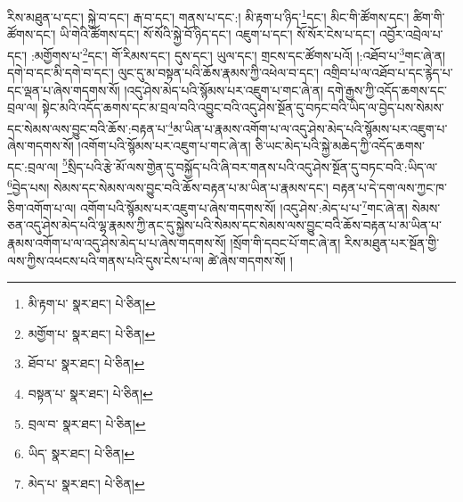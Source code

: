 རིས་མཐུན་པ་དང་། སྐྱེ་བ་དང་། རྒ་བ་དང་། གནས་པ་དང་:། མི་རྟག་པ་ཉིད་\footnote{མི་རྟག་པ་  སྣར་ཐང་།  པེ་ཅིན། }དང་། མིང་གི་ཚོགས་དང་། ཚིག་གི་ཚོགས་དང་། ཡི་གེའི་ཚོགས་དང་། སོ་སོའི་སྐྱེ་བོ་ཉིད་དང་། འཇུག་པ་དང་། སོ་སོར་ངེས་པ་དང་། འབྱོར་འབྲེལ་པ་དང་། :མགྱོགས་པ་\footnote{མགྱོག་པ་  སྣར་ཐང་།  པེ་ཅིན། }དང་། གོ་རིམས་དང་། དུས་དང་། ཡུལ་དང་། གྲངས་དང་ཚོགས་པའོ། །:འཐོབ་པ་\footnote{ཐོབ་པ་  སྣར་ཐང་།  པེ་ཅིན། }གང་ཞེ་ན། དགེ་བ་དང་མི་དགེ་བ་དང་། ལུང་དུ་མ་བསྟན་པའི་ཆོས་རྣམས་ཀྱི་འཕེལ་བ་དང་། འགྲིབ་པ་ལ་འཐོབ་པ་དང་རྙེད་པ་དང་ལྡན་པ་ཞེས་གདགས་སོ། །འདུ་ཤེས་མེད་པའི་སྙོམས་པར་འཇུག་པ་གང་ཞེ་ན། དགེ་རྒྱས་ཀྱི་འདོད་ཆགས་དང་བྲལ་ལ། སྟེང་མའི་འདོད་ཆགས་དང་མ་བྲལ་བའི་འབྱུང་བའི་འདུ་ཤེས་སྔོན་དུ་བཏང་བའི་ཡིད་ལ་བྱེད་པས་སེམས་དང་སེམས་ལས་བྱུང་བའི་ཆོས་:བརྟན་པ་\footnote{བསྟན་པ་  སྣར་ཐང་།  པེ་ཅིན། }མ་ཡིན་པ་རྣམས་འགོག་པ་ལ་འདུ་ཤེས་མེད་པའི་སྙོམས་པར་འཇུག་པ་ཞེས་གདགས་སོ། །འགོག་པའི་སྙོམས་པར་འཇུག་པ་གང་ཞེ་ན། ཅི་ཡང་མེད་པའི་སྐྱེ་མཆེད་ཀྱི་འདོད་ཆགས་དང་:བྲལ་ལ། \footnote{བྲལ་བ་  སྣར་ཐང་།  པེ་ཅིན། }སྲིད་པའི་རྩེ་མོ་ལས་གྱེན་དུ་བསྐྱོད་པའི་ཞི་བར་གནས་པའི་འདུ་ཤེས་སྔོན་དུ་བཏང་བའི་:ཡིད་ལ་\footnote{ཡིད་  སྣར་ཐང་།  པེ་ཅིན། }བྱེད་པས། སེམས་དང་སེམས་ལས་བྱུང་བའི་ཆོས་བརྟན་པ་མ་ཡིན་པ་རྣམས་དང་། བརྟན་པ་དེ་དག་ལས་ཀྱང་ཁ་ཅིག་འགོག་པ་ལ། འགོག་པའི་སྙོམས་པར་འཇུག་པ་ཞེས་གདགས་སོ། །འདུ་ཤེས་:མེད་པ་པ་\footnote{མེད་པ་  སྣར་ཐང་།  པེ་ཅིན། }གང་ཞེ་ན། སེམས་ཅན་འདུ་ཤེས་མེད་པའི་ལྷ་རྣམས་ཀྱི་ནང་དུ་སྐྱེས་པའི་སེམས་དང་སེམས་ལས་བྱུང་བའི་ཆོས་བརྟན་པ་མ་ཡིན་པ་རྣམས་འགོག་པ་ལ་འདུ་ཤེས་མེད་པ་པ་ཞེས་གདགས་སོ། །སྲོག་གི་དབང་པོ་གང་ཞེ་ན། རིས་མཐུན་པར་སྔོན་གྱི་ལས་ཀྱིས་འཕངས་པའི་གནས་པའི་དུས་ངེས་པ་ལ། ཚེ་ཞེས་གདགས་སོ། །
